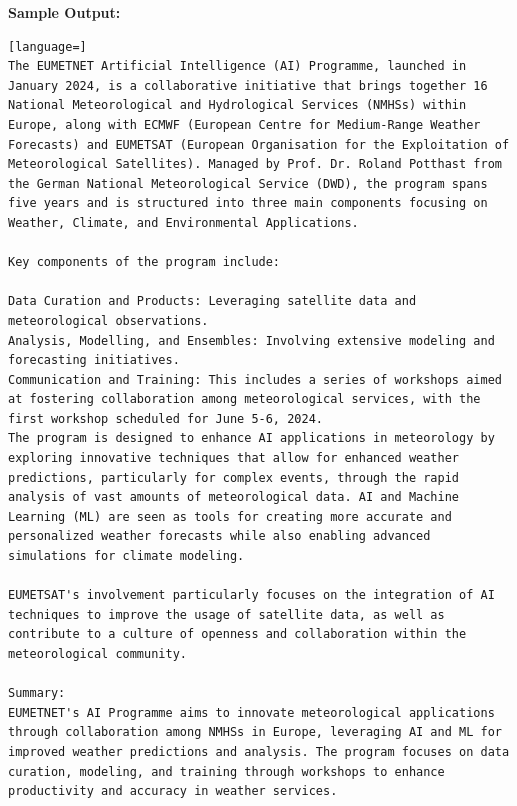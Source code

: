\textbf{Sample Output:}
\begin{lstlisting}[language=]
The EUMETNET Artificial Intelligence (AI) Programme, launched in January 2024, is a collaborative initiative that brings together 16 National Meteorological and Hydrological Services (NMHSs) within Europe, along with ECMWF (European Centre for Medium-Range Weather Forecasts) and EUMETSAT (European Organisation for the Exploitation of Meteorological Satellites). Managed by Prof. Dr. Roland Potthast from the German National Meteorological Service (DWD), the program spans five years and is structured into three main components focusing on Weather, Climate, and Environmental Applications.

Key components of the program include:

Data Curation and Products: Leveraging satellite data and meteorological observations.
Analysis, Modelling, and Ensembles: Involving extensive modeling and forecasting initiatives.
Communication and Training: This includes a series of workshops aimed at fostering collaboration among meteorological services, with the first workshop scheduled for June 5-6, 2024.
The program is designed to enhance AI applications in meteorology by exploring innovative techniques that allow for enhanced weather predictions, particularly for complex events, through the rapid analysis of vast amounts of meteorological data. AI and Machine Learning (ML) are seen as tools for creating more accurate and personalized weather forecasts while also enabling advanced simulations for climate modeling.

EUMETSAT's involvement particularly focuses on the integration of AI techniques to improve the usage of satellite data, as well as contribute to a culture of openness and collaboration within the meteorological community.

Summary:
EUMETNET's AI Programme aims to innovate meteorological applications through collaboration among NMHSs in Europe, leveraging AI and ML for improved weather predictions and analysis. The program focuses on data curation, modeling, and training through workshops to enhance productivity and accuracy in weather services.
\end{lstlisting}



